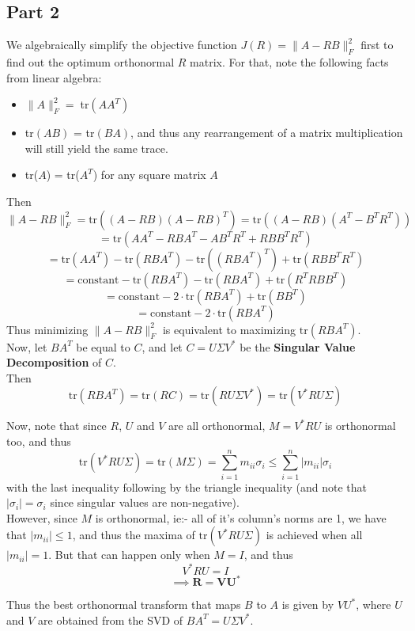 \documentclass[a4paper,14pt]{article}
\numberwithin{definition}{section}
\numberwithin{mytheorem}{subsection}
\begin{document}
\subsection{Part 2}
We algebraically simplify the objective function $J(R) = \lVert A - RB\rVert^2_F$ first to find out the optimum orthonormal $R$ matrix. For that, note the following facts from linear algebra:
\begin{itemize}
    \item $\lVert A\rVert^2_F = \;$tr$(AA^T)$
    \item tr$(AB)$ = tr$(BA)$, and thus any rearrangement of a matrix multiplication will still yield the same trace.
    \item tr($A$) = tr($A^T$) for any square matrix $A$
\end{itemize}
Then 
$$\lVert A - RB\rVert^2_F = \mathrm{tr}((A - RB)(A - RB)^T) = \mathrm{tr}((A - RB)(A^T - B^TR^T))$$
$$ = \mathrm{tr}(AA^T - RBA^T - AB^TR^T + RBB^TR^T)$$
$$ = \mathrm{tr}(AA^T) - \mathrm{tr}(RBA^T) - \mathrm{tr}((RBA^T)^T) + \mathrm{tr}(RBB^TR^T)$$
$$ = \mathrm{constant} - \mathrm{tr}(RBA^T) - \mathrm{tr}(RBA^T) + \mathrm{tr}(R^TRBB^T)$$
$$ = \mathrm{constant} - 2\cdot\mathrm{tr}(RBA^T) + \mathrm{tr}(BB^T)$$
$$ = \mathrm{constant} - 2\cdot\mathrm{tr}(RBA^T)$$
Thus minimizing $\lVert A - RB\rVert^2_F$ is equivalent to maximizing $\mathrm{tr}(RBA^T)$. \\
Now, let $BA^T$ be equal to $C$, and let $C = U\Sigma V^*$ be the \textbf{Singular Value Decomposition} of $C$.\\
Then
$$\mathrm{tr}(RBA^T) = \mathrm{tr}(RC) = \mathrm{tr}(RU\Sigma V^*) = \mathrm{tr}(V^*RU\Sigma)$$

Now, note that since $R$, $U$ and $V$ are all orthonormal, $M = V^*RU$ is orthonormal too, and thus 
$$\mathrm{tr}(V^*RU\Sigma) = \mathrm{tr}(M\Sigma) = \sum^{n}_{i = 1} m_{ii}\sigma_i\leq\sum^{n}_{i = 1} |m_{ii}|\sigma_i$$
with the last inequality following by the triangle inequality (and note that $|\sigma_i| = \sigma_i$ since singular values are non-negative).\\

However, since $M$ is orthonormal, ie:- all of it's column's norms are 1, we have that $|m_{ii}|\leq 1$, and thus the maxima of $\mathrm{tr}(V^*RU\Sigma)$ is achieved when all $|m_{ii}| = 1$. But that can happen only when $M = I$, and thus
$$V^*RU = I $$
$$\boldsymbol{\implies R = VU^*}$$

Thus the best orthonormal transform that maps $B$ to $A$ is given by $VU^*$, where $U$ and $V$ are obtained from the SVD of $BA^T = U\Sigma V^*$.\\
\end{document}
